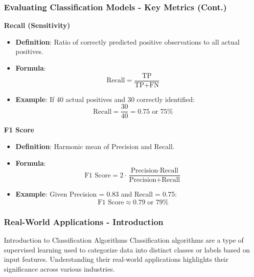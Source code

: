 \documentclass{beamer}
\begin{document}
\begin{frame}[fragile]
    \frametitle{Evaluating Classification Models - Key Metrics (Cont.)}
    \textbf{Recall (Sensitivity)}
    \begin{itemize}
        \item \textbf{Definition}: Ratio of correctly predicted positive observations to all actual positives.
        \item \textbf{Formula}: 
        \begin{equation}
        \text{Recall} = \frac{\text{TP}}{\text{TP} + \text{FN}} 
        \end{equation}
        \item \textbf{Example}: If 40 actual positives and 30 correctly identified:
        \begin{equation}
        \text{Recall} = \frac{30}{40} = 0.75 \text{ or } 75\%
        \end{equation}
    \end{itemize}

    \textbf{F1 Score}
    \begin{itemize}
        \item \textbf{Definition}: Harmonic mean of Precision and Recall.
        \item \textbf{Formula}: 
        \begin{equation}
        \text{F1 Score} = 2 \cdot \frac{\text{Precision} \cdot \text{Recall}}{\text{Precision} + \text{Recall}} 
        \end{equation}
        \item \textbf{Example}: Given Precision = 0.83 and Recall = 0.75:
        \begin{equation}
        \text{F1 Score} \approx 0.79 \text{ or } 79\%
        \end{equation}
    \end{itemize}
\end{frame}

\begin{frame}[fragile]
    \frametitle{Real-World Applications - Introduction}
    \begin{block}{Introduction to Classification Algorithms}
        Classification algorithms are a type of supervised learning used to categorize data into distinct classes or labels based on input features. Understanding their real-world applications highlights their significance across various industries.
    \end{block}
\end{frame}
\end{document}
